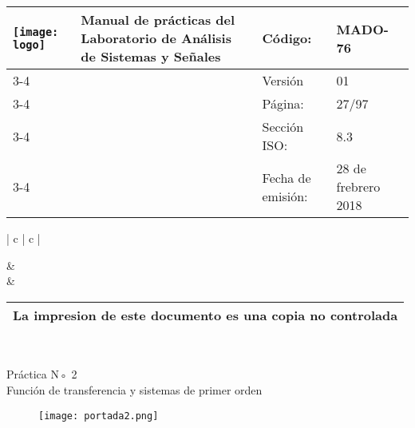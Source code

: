 
	\centering
	\begin{tabular}{ |	p{30 mm}|	p{61 mm}	|	p{33mm}	| p{43mm}	| } 
	\hline
	
	
	\multirow{4}{30mm}{\centering \texttt{[image: logo]}} &
	\multirow{4}{61mm}{\centering \textbf{ \textbf{Manual de prácticas del Laboratorio de Análisis de Sistemas y Señales}}}    & Código: & MADO-76 \\
	\cline{3-4}
	& &  Versión & 01 \\
	\cline{3-4}
	& & Página: & 27/97 \\ \cline{3-4}
	& & Sección ISO: & 8.3 \\ \cline{3-4}
	& & Fecha de emisión: & 28 de frebrero 2018 \\
	\hline
	\end{tabular}
\begin{tabular}{ |	c |	c	| } 
	
	 &
	   \\
	& \\ \hline
\end{tabular}
\begin{tabular}{|p{180mm}|}
	\multirow{1}{180mm}{ \centering La impresion de este documento es una copia no controlada }  \\ \hline \end{tabular} \\

\vspace{1cm}

{\Huge Práctica N◦ 2 \\ Función de transferencia y sistemas de primer
	orden
}

\hspace{5cm}

\begin{figure}[!h]
	\centering
	\texttt{[image: portada2.png]}
\end{figure}

